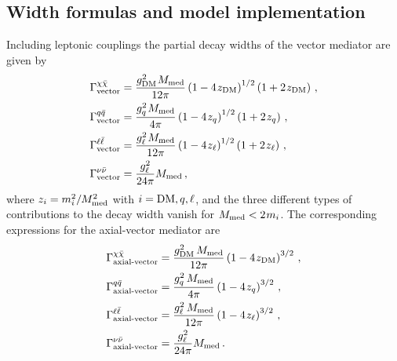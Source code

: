 \documentclass[a4paper, 11pt,notoc]{article}
\newcommand{\mmed}{\ensuremath{M_{\rm{med}}}\xspace}
\newcommand{\gDM}{\ensuremath{g_{\rm{DM}}}\xspace}
\newcommand{\gq}{\ensuremath{g_q}\xspace}
\begin{document}
\subsection{Width formulas and model implementation}

Including leptonic couplings the partial decay widths of the vector mediator are given by
\begin{align}
\Gamma_{\text{vector}}^{\chi\bar{\chi}} & = \frac{\gDM^2 \hspace{0.25mm} \mmed}{12\pi} 
 \left (1-4 \hspace{0.25mm}  z_{\rm{DM}} \right )^{1/2} \left(1 + 2 \hspace{0.25mm}  z_{\rm{DM}} \right) \, , \\
\Gamma_{\text{vector}}^{q\bar{q}} & = \frac{\gq^2 \hspace{0.25mm}  \mmed}{4\pi} 
 \left ( 1-4 \hspace{0.25mm}  z_q \right )^{1/2}   \left(1 + 2 \hspace{0.25mm}  z_q \right) \, , \\
 \Gamma_{\text{vector}}^{\ell\bar{\ell}} & = \frac{g_\ell^2 \hspace{0.25mm}  \mmed}{12\pi} 
 \left ( 1-4 \hspace{0.25mm}  z_\ell \right )^{1/2}   \left(1 + 2 \hspace{0.25mm}  z_\ell \right) \, , \\
 \Gamma_{\rm vector}^{\nu\bar{\nu}} & = \frac{g_\ell^2}{24\pi} \mmed \, , 
\end{align}
where $z_i = m_i^2/\mmed^2$ with $i={\rm DM},q,\ell$, and the three different types of contributions to the decay width vanish for $\mmed < 2 \hspace{0.25mm}  m_i$. 
The corresponding expressions for the axial-vector mediator are
\begin{align}
\Gamma_{\text{axial-vector}}^{\chi\bar{\chi}} & = \frac{\gDM^2 \, \mmed}{12\pi} 
\left ( 1-4 \hspace{0.25mm} z_{\rm{DM}} \right ) ^{3/2} \,, \\ 
  \Gamma_{\text{axial-vector}}^{q\bar{q}} & =  \frac{\gq^2 \, \mmed}{4\pi} 
\left ( 1-4 \hspace{0.25mm} z_q \right ) ^{3/2} \, , \\
  \Gamma_{\text{axial-vector}}^{\ell\bar{\ell}} & =  \frac{g_\ell^2 \, \mmed}{12\pi} 
\left ( 1-4 \hspace{0.25mm} z_\ell \right ) ^{3/2} \, , \\
 \Gamma_{\text{axial-vector}}^{\nu\bar{\nu}} & = \frac{g_\ell^2}{24\pi} \mmed \, .   
\end{align}
\end{document}
